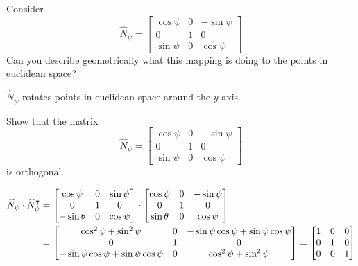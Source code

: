 \documentclass[newpage,hints,handout]{ximera}
\begin{document}
\begin{problem}
  Consider
  \[
  \hat{N}_\psi=\begin{bmatrix}
  \cos\psi & 0 & -\sin\psi\\
  0 & 1 & 0\\
  \sin\psi & 0 & \cos\psi
  \end{bmatrix}
  \]
  Can you describe geometrically what this mapping is doing
  to the points in euclidean space?
  
  
\begin{freeResponse}
$\hat{N}_\psi$ rotates points in euclidean space around the $y$-axis.
\end{freeResponse}

\end{problem}


\begin{problem}
Show that the matrix
\[
\hat{N}_\psi=\begin{bmatrix}
\cos\psi & 0 & -\sin\psi\\
0 & 1 & 0\\
\sin\psi & 0 & \cos\psi
\end{bmatrix}
\]
is orthogonal.

\begin{freeResponse}
\begin{align*}
\widehat{N}_\psi \cdot \widehat{N}_\psi^\intercal
&= \begin{bmatrix}
	\cos\psi & 0 & \sin\psi \\
	0 & 1 & 0 \\
	-\sin\theta & 0 & \cos\psi 
	\end{bmatrix} \cdot
	\begin{bmatrix}
	\cos\psi & 0 & -\sin\psi \\
	0 & 1 & 0 \\
	\sin\theta & 0 & \cos\psi 
	\end{bmatrix}  \\
	&= \begin{bmatrix}
	\cos^{2}\psi + \sin^{2} \psi & 0 & -\sin\psi \cos\psi + \sin\psi \cos\psi \\
	0 &  1 & 0 \\
	 -\sin\psi \cos\psi + \sin\psi \cos\psi & 0 & \cos^{2}\psi + \sin^{2} \psi 
	\end{bmatrix}
	=  \begin{bmatrix}
	1 & 0 & 0 \\
	0 & 1  & 0 \\
	0 & 0 & 1
	\end{bmatrix}
\end{align*}
\end{freeResponse}
\end{problem}
\end{document}
